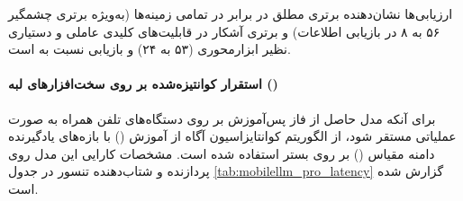 \begin{table}[htbp]
\centering
\caption{ارزیابی مقایسه‌ای  در برابر  (۱۰۰ نمونه در هر دسته)}
\label{tab:human_eval_gemma}
\end{table}

\begin{table}[htbp]
\centering
\caption{ارزیابی مقایسه‌ای  در برابر  (۱۰۰ نمونه در هر دسته)}
\label{tab:human_eval_llama}
\end{table}

ارزیابی‌ها نشان‌دهنده برتری مطلق در برابر  در تمامی زمینه‌ها (به‌ویژه برتری چشمگیر ۵۶ به ۸ در بازیابی اطلاعات) و برتری آشکار در قابلیت‌های کلیدی عاملی و دستیاری نظیر ابزارمحوری (۵۳ به ۲۴) و بازیابی نسبت به  است.

\paragraph*{استقرار کوانتیزه‌شده بر روی سخت‌افزارهای لبه ()}
برای آنکه مدل حاصل از فاز پس‌آموزش بر روی دستگاه‌های تلفن همراه به صورت عملیاتی مستقر شود، از الگوریتم کوانتایزاسیون آگاه از آموزش () با بازه‌های یادگیرنده دامنه مقیاس () بر روی بستر  استفاده شده است. مشخصات کارایی این مدل روی پردازنده  و شتاب‌دهنده تنسور  در جدول \ref{tab:mobilellm_pro_latency} گزارش شده است.

